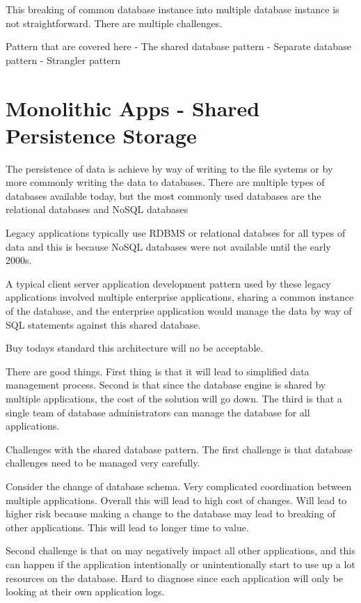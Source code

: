 This breaking of common database instance into multiple database instance is not straightforward.
There are multiple challenges.

Pattern that are covered here
- The shared database pattern
- Separate database pattern
- Strangler pattern

\section{Monolithic Apps - Shared Persistence Storage}
The persistence of data is achieve by way of writing to the file systems or by more commonly writing the data to databases.
There are multiple types of databases available today, but the most commonly used databases are the relational databases and NoSQL databases

Legacy applications typically use RDBMS or relational databses for all types of data and this is because NoSQL databases were not available until the early 2000s.

A typical client server application development pattern used by these legacy applications involved multiple enterprise applications, sharing a common instance of the database,
and the enterprise application would manage the data by way of SQL statements against this shared database.

Buy todays standard this architecture will no be acceptable.

There are good things.
First thing is that it will lead to simplified data management process.
Second is that since the database engine is shared by multiple applications, the cost of the solution will go down.
The third is that a single team of database administrators can manage the database for all applications.

Challenges with the shared database pattern.
The first challenge is that database challenges need to be managed very carefully.

Consider the change of database schema.
Very complicated coordination between multiple applications.
Overall this will lead to high cost of changes.
Will lead to higher risk because making a change to the database may lead to breaking of other applications.
This will lead to longer time to value.

Second challenge is that on may negatively impact all other applications, and this can happen if the application intentionally or unintentionally start to use up a lot resources on the database.
Hard to diagnose since each application will only be looking at their own application logs.

